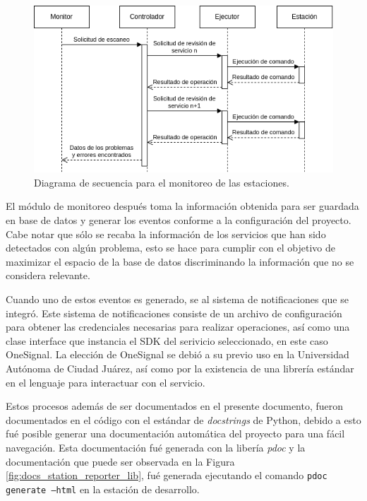 \begin{figure}[!ht]
	\centering
	\includegraphics[width=0.9\linewidth]{images/diagrams/classes/monitoring_diagram.drawio.png}
	\caption{Diagrama de secuencia para el monitoreo de las estaciones.}
	\label{fig:diagrama_secuencia_de_monitoreo}
\end{figure}

El módulo de monitoreo después toma la información obtenida para ser guardada en base de datos y generar los eventos conforme a la configuración del proyecto. Cabe notar que sólo se recaba la información de los servicios que han sido detectados con algún problema, esto se hace para cumplir con el objetivo de maximizar el espacio de la base de datos discriminando la información que no se considera relevante.

Cuando uno de estos eventos es generado, se al sistema de notificaciones que se integró. Este sistema de notificaciones consiste de un archivo de configuración para obtener las credenciales necesarias para realizar operaciones, así como una clase interface que instancia el SDK del serivicio seleccionado, en este caso OneSignal. La elección de OneSignal se debió a su previo uso en la Universidad Autónoma de Ciudad Juárez, así como por la existencia de una librería estándar en el lenguaje para interactuar con el servicio.

Estos procesos además de ser documentados en el presente documento, fueron documentados en el código con el estándar de \textit{docstrings} de Python, debido a esto fué posible generar una documentación automática del proyecto para una fácil navegación. Esta documentación fué generada con la libería \textit{pdoc} y la documentación que puede ser observada en la Figura \ref{fig:docs_station_reporter_lib}, fué generada ejecutando el comando \texttt{pdoc generate --html} en la estación de desarrollo.


